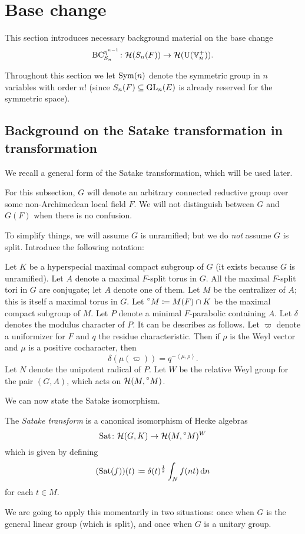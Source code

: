 \chapter{Base change}
\label{ch:satake}

This section introduces necessary background material on the base change
\[ \operatorname{BC}_{S_n}^{\eta^{n-1}} \colon \mathcal H(S_n(F)) \to \mathcal H(\operatorname{U}(\mathbb V_n^+)). \]

Throughout this section we let $\operatorname{Sym}(n)$ denote the symmetric group in $n$ variables
with order $n!$
(since $S_n(F) \subseteq \operatorname{GL}_n(E)$ is already reserved for the symmetric space).

\section{Background on the Satake transformation in transformation}
We recall a general form of the Satake transformation, which will be used later.

For this subsection, $G$ will denote an arbitrary connected reductive group
over some non-Archimedean local field $F$.
We will not distinguish between $G$ and $G(F)$ when there is no confusion.

To simplify things, we will assume $G$ is unramified;
but we do \emph{not} assume $G$ is split.
Introduce the following notation:
\begin{itemize}
  \ii Let $K$ be a hyperspecial maximal compact subgroup of $G$
  (it exists because $G$ is unramified).
  \ii Let $A$ denote a maximal $F$-split torus in $G$.
  All the maximal $F$-split tori in $G$ are conjugate; let $A$ denote one of them.
  \ii Let $M$ be the centralizer of $A$; this is itself a maximal torus in $G$.
  \ii Let $\prescript{\circ}{} M \coloneqq M(F) \cap K$
  be the maximal compact subgroup of $M$.
  \ii Let $P$ denote a minimal $F$-parabolic containing $A$.
  \ii Let $\delta$ denotes the modulus character of $P$.
  It can be describes as follows.
  Let $\varpi$ denote a uniformizer for $F$ and $q$ the residue characteristic.
  Then if $\rho$ is the Weyl vector and $\mu$ is a positive cocharacter, then
  \[ \delta(\mu(\varpi)) = q^{- \left< \mu, \rho\right>}. \]
  \ii Let $N$ denote the unipotent radical of $P$.
  \ii Let $W$ be the relative Weyl group for the pair $(G,A)$,
  which acts on $\mathcal H(M, \prescript{\circ}{} M)$.
\end{itemize}
We can now state the Satake isomorphism.
\begin{definition}
  The \emph{Satake transform} is a canonical isomorphism of Hecke algebras
  \[ \operatorname{Sat} \colon \mathcal H(G, K) \to \mathcal H(M, \prescript{\circ}{} M)^W \]
  which is given by defining
  \[ (\Sat(f))(t) \coloneqq \delta(t)^\half \int_N f(nt) \odif n  \]
  for each $t \in M$.
\end{definition}
We are going to apply this momentarily in two situations:
once when $G$ is the general linear group (which is split),
and once when $G$ is a unitary group.


